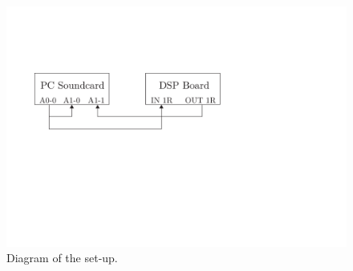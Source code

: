 \begin{figure}[H]
	\centering
	\includegraphics{../Journal/Experiments/Figures/FIRFilterTestSetup}
	\caption{Diagram of the set-up.}
	\label{Fig:FIRSetupDiagram}
\end{figure}

